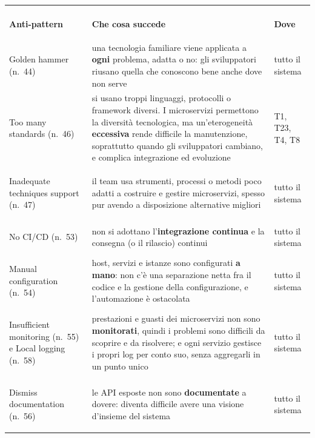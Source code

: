 \begin{center}
\renewcommand{\arraystretch}{1.3}
\begin{tabular}{@{}>{\bfseries\raggedright\arraybackslash}p{3.7cm} >{\raggedright\arraybackslash}p{9.6cm}
                >{\raggedright\arraybackslash}p{2.1cm}@{}}
  \toprule
  \multicolumn{3}{@{}l}{\textcolor{swteal}{\textbf{Organizzazione dei team}}} \\
  \normalfont\textbf{Anti-pattern} & \textbf{Che cosa succede} & \textbf{Dove} \\
  \midrule
  Golden hammer (n.~44) & una tecnologia familiare viene applicata a \textbf{ogni} problema, adatta o no: gli
    sviluppatori riusano quella che conoscono bene anche dove non serve & tutto il sistema \\
  Too many standards (n.~46) & si usano troppi linguaggi, protocolli o framework diversi. I microservizi permettono la
    diversità tecnologica, ma un'eterogeneità \textbf{eccessiva} rende difficile la manutenzione, soprattutto quando gli
    sviluppatori cambiano, e complica integrazione ed evoluzione & T1, T23, T4, T8 \\
  Inadequate techniques support (n.~47) & il team usa strumenti, processi o metodi poco adatti a costruire e gestire
    microservizi, spesso pur avendo a disposizione alternative migliori & tutto il sistema \\
  No CI/CD (n.~53) & non si adottano l'\textbf{integrazione continua} e la consegna (o il rilascio) continui & tutto il
    sistema \\
  Manual configuration (n.~54) & host, servizi e istanze sono configurati \textbf{a mano}: non c'è una separazione netta
    fra il codice e la gestione della configurazione, e l'automazione è ostacolata & tutto il sistema \\
  Insufficient monitoring (n.~55) e Local logging (n.~58) & prestazioni e guasti dei microservizi non sono
    \textbf{monitorati}, quindi i problemi sono difficili da scoprire e da risolvere; e ogni servizio gestisce i propri log
    per conto suo, senza aggregarli in un punto unico & tutto il sistema \\
  Dismiss documentation (n.~56) & le API esposte non sono \textbf{documentate} a dovere: diventa difficile avere una
    visione d'insieme del sistema & tutto il sistema \\
  \bottomrule
\end{tabular}
\end{center}


